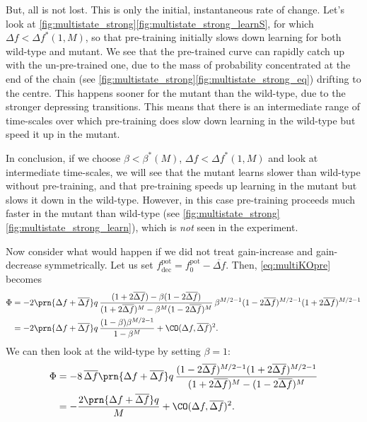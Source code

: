 \documentclass[12pt]{article}
\newcommand{\pot}{^{\text{pot}}}
\newcommand{\norm}{_0}
\newcommand{\dec}{_{\text{dec}}}
\begin{document}
But, all is not lost.
This is only the initial, instantaneous rate of change.
Let's look at \autoref{fig:multistate_strong}\ref{fig:multistate_strong_learnS}, for which $\Delta f < \Delta f^*(1,M)$, so that pre-training initially slows down learning for both wild-type and mutant.
We see that the pre-trained curve can rapidly catch up with the un-pre-trained one, due to the mass of probability concentrated at the end of the chain (see \autoref{fig:multistate_strong}\ref{fig:multistate_strong_eq}) drifting to the centre.
This happens sooner for the mutant than the wild-type, due to the stronger depressing transitions.
This means that there is an intermediate range of time-scales over which pre-training does slow down learning in the wild-type but speed it up in the mutant.

In conclusion, if we choose $\beta<\beta^*(M)$, $\Delta f < \Delta f^*(1,M)$ and look at intermediate time-scales, we will see that the mutant learns slower than wild-type without pre-training, and that pre-training speeds up learning in the mutant but slows it down in the wild-type.
However, in this case pre-training proceeds much faster in the mutant than wild-type (see \autoref{fig:multistate_strong}\ref{fig:multistate_strong_learn}), which is \emph{not} seen in the experiment.

Now consider what would happen if we did not treat gain-increase and gain-decrease symmetrically.
Let us set $f\pot\dec = f\pot\norm - \overline{\Delta f}$.
Then, \eqref{eq:multiKOpre} becomes
%
\begin{equation}\label{eq:multiKOdiffpre}
\begin{aligned}
  \Phi &= -2\prn{\Delta f + \overline{\Delta f}} q \, \frac{(1+2\overline{\Delta f}) - \beta(1-2\overline{\Delta f})}
          {(1+2\overline{\Delta f})^M - \beta^M(1-2\overline{\Delta f})^M}   \,
          \beta^{M/2-1}(1-2\overline{\Delta f})^{M/2-1} (1+2\overline{\Delta f})^{M/2-1} \\
       &= -2\prn{\Delta f + \overline{\Delta f}} q\,\frac{(1-\beta)\beta^{M/2-1}}{1-\beta^M} + \CO(\Delta f,\overline{\Delta f})^2.
\end{aligned}
\end{equation}
%
We can then look at the wild-type by setting $\beta=1$:
%
\begin{equation}\label{eq:multiWTdiffpre}
\begin{aligned}
  \Phi &= -8\,\overline{\Delta f}\prn{\Delta f + \overline{\Delta f}} q \,
          \frac{(1-2\overline{\Delta f})^{M/2-1} (1+2\overline{\Delta f})^{M/2-1} }
          {(1+2\overline{\Delta f})^M - (1-2\overline{\Delta f})^M}   \\
       &= -\frac{2\prn{\Delta f + \overline{\Delta f}} q}{M} + \CO(\Delta f,\overline{\Delta f})^2.
\end{aligned}
\end{equation}
%
\end{document}
